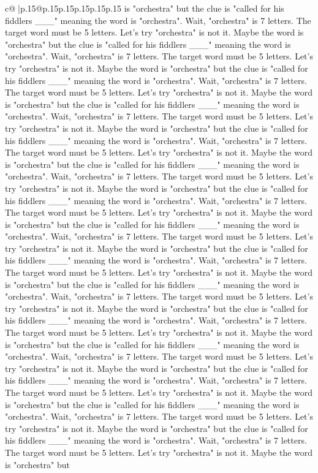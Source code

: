\documentclass{article}
\begin{document}
{\begin{supertabular}{c@{$\;$}|p{.15\linewidth}@{}p{.15\linewidth}p{.15\linewidth}p{.15\linewidth}p{.15\linewidth}p{.15\linewidth}}
{{{is "orchestra" but the clue is "called for his fiddlers \_\_\_" meaning the word is "orchestra". Wait, "orchestra" is 7 letters. The target word must be 5 letters. Let's try "orchestra" is not it. Maybe the word is "orchestra" but the clue is "called for his fiddlers \_\_\_" meaning the word is "orchestra". Wait, "orchestra" is 7 letters. The target word must be 5 letters. Let's try "orchestra" is not it. Maybe the word is "orchestra" but the clue is "called for his fiddlers \_\_\_" meaning the word is "orchestra". Wait, "orchestra" is 7 letters. The target word must be 5 letters. Let's try "orchestra" is not it. Maybe the word is "orchestra" but the clue is "called for his fiddlers \_\_\_" meaning the word is "orchestra". Wait, "orchestra" is 7 letters. The target word must be 5 letters. Let's try "orchestra" is not it. Maybe the word is "orchestra" but the clue is "called for his fiddlers \_\_\_" meaning the word is "orchestra". Wait, "orchestra" is 7 letters. The target word must be 5 letters. Let's try "orchestra" is not it. Maybe the word is "orchestra" but the clue is "called for his fiddlers \_\_\_" meaning the word is "orchestra". Wait, "orchestra" is 7 letters. The target word must be 5 letters. Let's try "orchestra" is not it. Maybe the word is "orchestra" but the clue is "called for his fiddlers \_\_\_" meaning the word is "orchestra". Wait, "orchestra" is 7 letters. The target word must be 5 letters. Let's try "orchestra" is not it. Maybe the word is "orchestra" but the clue is "called for his fiddlers \_\_\_" meaning the word is "orchestra". Wait, "orchestra" is 7 letters. The target word must be 5 letters. Let's try "orchestra" is not it. Maybe the word is "orchestra" but the clue is "called for his fiddlers \_\_\_" meaning the word is "orchestra". Wait, "orchestra" is 7 letters. The target word must be 5 letters. Let's try "orchestra" is not it. Maybe the word is "orchestra" but the clue is "called for his fiddlers \_\_\_" meaning the word is "orchestra". Wait, "orchestra" is 7 letters. The target word must be 5 letters. Let's try "orchestra" is not it. Maybe the word is "orchestra" but the clue is "called for his fiddlers \_\_\_" meaning the word is "orchestra". Wait, "orchestra" is 7 letters. The target word must be 5 letters. Let's try "orchestra" is not it. Maybe the word is "orchestra" but the clue is "called for his fiddlers \_\_\_" meaning the word is "orchestra". Wait, "orchestra" is 7 letters. The target word must be 5 letters. Let's try "orchestra" is not it. Maybe the word is "orchestra" but the clue is "called for his fiddlers \_\_\_" meaning the word is "orchestra". Wait, "orchestra" is 7 letters. The target word must be 5 letters. Let's try "orchestra" is not it. Maybe the word is "orchestra" but the clue is "called for his fiddlers \_\_\_" meaning the word is "orchestra". Wait, "orchestra" is 7 letters. The target word must be 5 letters. Let's try "orchestra" is not it. Maybe the word is "orchestra" but the clue is "called for his fiddlers \_\_\_" meaning the word is "orchestra". Wait, "orchestra" is 7 letters. The target word must be 5 letters. Let's try "orchestra" is not it. Maybe the word is "orchestra" but }}}
\end{supertabular}}
\end{document}
